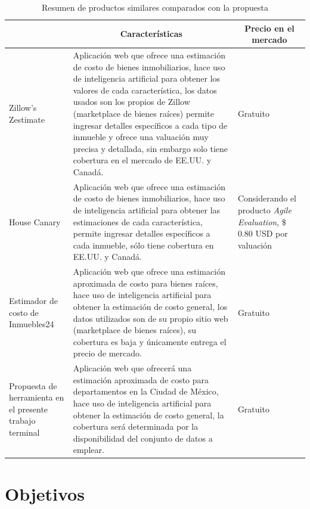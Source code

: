 \begin{table}[H]
    \caption[Resumen de productos similares]{Resumen de productos similares comparados con la propuesta}
    \centering
    \begin{tabular}{|m{3.5cm}|m{6.5cm}|m{3.5cm}|}
        \hline
          \rowcolor{azulclaro}
          \multicolumn{1}{|c|}{\textbf{Software}} &
          \multicolumn{1}{c|}{\textbf{Características}} &
          \multicolumn{1}{c|}{\textbf{Precio en el mercado}} \\
        \hline
        Zillow’s Zestimate \cite{zillow2023} & Aplicación web que ofrece una estimación de costo de bienes inmobiliarios, hace uso de inteligencia artificial para obtener los valores de cada característica, los datos usados son los propios de Zillow (marketplace de bienes raíces) permite ingresar detalles específicos a cada tipo de inmueble y ofrece una valuación muy precisa y detallada, sin embargo solo tiene cobertura en el mercado de EE.UU. y Canadá. & Gratuito \\
        \hline
        House Canary \cite{housecanary2021} & Aplicación web que ofrece una estimación de costo de bienes inmobiliarios, hace uso de inteligencia artificial para obtener las estimaciones de cada característica, permite ingresar detalles específicos a cada inmueble, sólo tiene cobertura en EE.UU. y Canadá. & Considerando el producto \textit{Agile Evaluation}, \$ 0.80 USD por valuación  \\
        \hline
        Estimador de costo de Inmuebles24 \cite{inmuebles24} & Aplicación web que ofrece una estimación aproximada de costo para bienes raíces, hace uso de inteligencia artificial para obtener la estimación de costo general, los datos utilizados son de su propio sitio web (marketplace de bienes raíces), su cobertura es baja y únicamente entrega el precio de mercado. & Gratuito \\
        \hline
        Propuesta de herramienta en el presente trabajo terminal & Aplicación web que ofrecerá una estimación aproximada de costo para departamentos en la Ciudad de México, hace uso de inteligencia artificial para obtener la estimación de costo general, la cobertura será determinada por la disponibilidad del conjunto de datos a emplear. & Gratuito \\
        \hline
    \end{tabular}
    \label{table:PropuestasSimilares}
\end{table}

\section{Objetivos}

